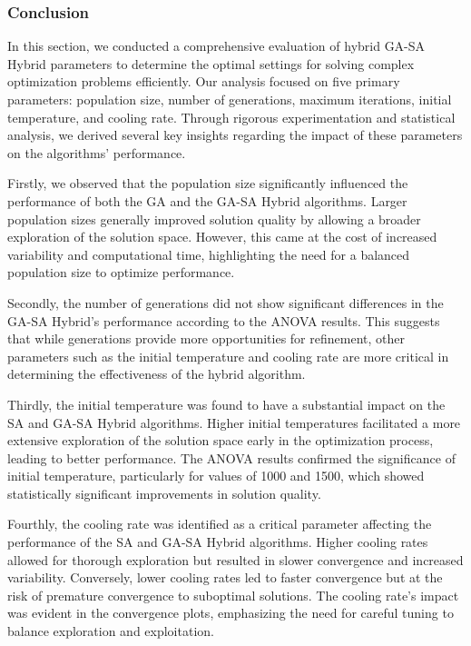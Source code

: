 \documentclass[
]{article}
\begin{document}
    \subsubsection{Conclusion}

    In this section, we conducted a comprehensive evaluation of hybrid GA-SA Hybrid parameters to determine the optimal settings for solving complex optimization problems efficiently. Our analysis focused on five primary parameters: population size, number of generations, maximum iterations, initial temperature, and cooling rate. Through rigorous experimentation and statistical analysis, we derived several key insights regarding the impact of these parameters on the algorithms' performance.

    Firstly, we observed that the population size significantly influenced the performance of both the GA and the GA-SA Hybrid algorithms. Larger population sizes generally improved solution quality by allowing a broader exploration of the solution space. However, this came at the cost of increased variability and computational time, highlighting the need for a balanced population size to optimize performance.

    Secondly, the number of generations did not show significant differences in the GA-SA Hybrid's performance according to the ANOVA results. This suggests that while generations provide more opportunities for refinement, other parameters such as the initial temperature and cooling rate are more critical in determining the effectiveness of the hybrid algorithm.

    Thirdly, the initial temperature was found to have a substantial impact on the SA and GA-SA Hybrid algorithms. Higher initial temperatures facilitated a more extensive exploration of the solution space early in the optimization process, leading to better performance. The ANOVA results confirmed the significance of initial temperature, particularly for values of 1000 and 1500, which showed statistically significant improvements in solution quality.

    Fourthly, the cooling rate was identified as a critical parameter affecting the performance of the SA and GA-SA Hybrid algorithms. Higher cooling rates allowed for thorough exploration but resulted in slower convergence and increased variability. Conversely, lower cooling rates led to faster convergence but at the risk of premature convergence to suboptimal solutions. The cooling rate's impact was evident in the convergence plots, emphasizing the need for careful tuning to balance exploration and exploitation.
\end{document}
